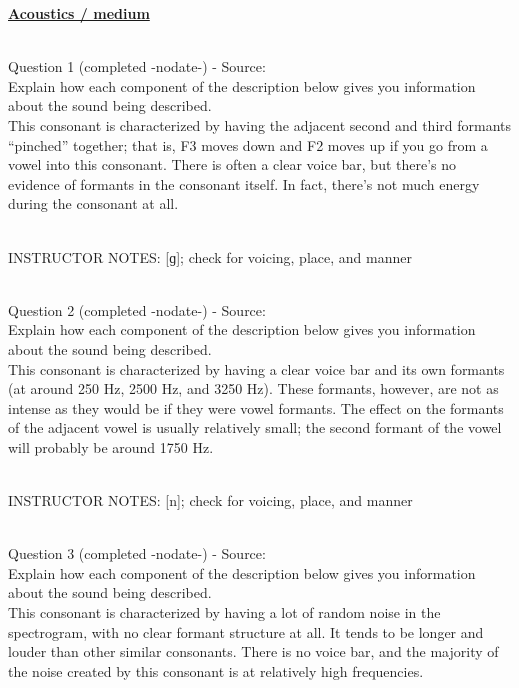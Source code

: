 \documentclass[12pt]{article}
\begin{document}
\newpage\textbf{\underline{\huge Acoustics / medium\\}}

~\\

{\large Question 1} (completed -nodate-) - Source: \\

Explain how each component of the description below gives you information about the sound being described.\\

This consonant is characterized by having the adjacent second and third formants “pinched” together; that is, F3 moves down and F2 moves up if you go from a vowel into this consonant. There is often a clear voice bar, but there’s no evidence of formants in the consonant itself. In fact, there’s not much energy during the consonant at all.


~\\
INSTRUCTOR NOTES: [ɡ]; check for voicing, place, and manner


~\\

{\large Question 2} (completed -nodate-) - Source: \\

Explain how each component of the description below gives you information about the sound being described.\\

This consonant is characterized by having a clear voice bar and its own formants (at around 250 Hz, 2500 Hz, and 3250 Hz). These formants, however, are not as intense as they would be if they were vowel formants. The effect on the formants of the adjacent vowel is usually relatively small; the second formant of the vowel will probably be around 1750 Hz.


~\\
INSTRUCTOR NOTES: [n]; check for voicing, place, and manner


~\\

{\large Question 3} (completed -nodate-) - Source: \\

Explain how each component of the description below gives you information about the sound being described.\\

This consonant is characterized by having a lot of random noise in the spectrogram, with no clear formant structure at all. It tends to be longer and louder than other similar consonants. There is no voice bar, and the majority of the noise created by this consonant is at relatively high frequencies.
\end{document}
